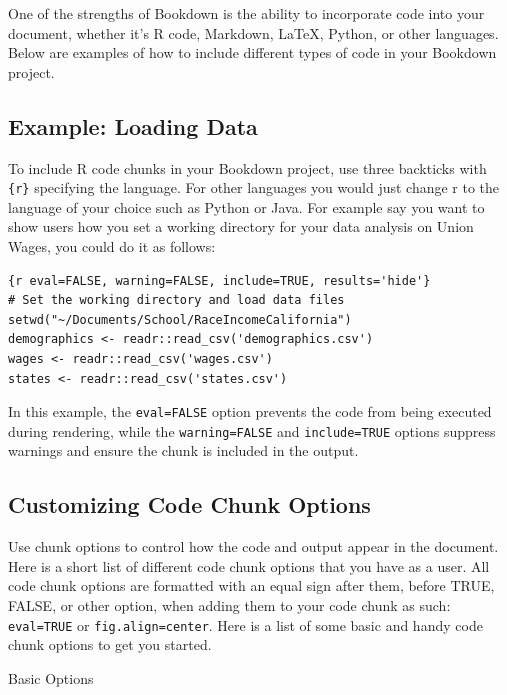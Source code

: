 \documentclass[
]{book}
\theoremstyle{definition}
\theoremstyle{definition}
\theoremstyle{definition}
\theoremstyle{definition}
\theoremstyle{remark}
\begin{document}
One of the strengths of Bookdown is the ability to incorporate code into your document, whether it's R code, Markdown, LaTeX, Python, or other languages. Below are examples of how to include different types of code in your Bookdown project.

\subsection{Example: Loading Data}\label{example-loading-data}

To include R code chunks in your Bookdown project, use three backticks \texttt{\textasciigrave{}\textasciigrave{}\textasciigrave{}} with \texttt{\{r\}} specifying the language. For other languages you would just change r to the language of your choice such as Python or Java. For example say you want to show users how you set a working directory for your data analysis on Union Wages, you could do it as follows:

\begin{verbatim}
{r eval=FALSE, warning=FALSE, include=TRUE, results='hide'}
# Set the working directory and load data files
setwd("~/Documents/School/RaceIncomeCalifornia")
demographics <- readr::read_csv('demographics.csv')
wages <- readr::read_csv('wages.csv')
states <- readr::read_csv('states.csv')
\end{verbatim}

In this example, the \texttt{eval=FALSE} option prevents the code from being executed during rendering, while the \texttt{warning=FALSE} and \texttt{include=TRUE} options suppress warnings and ensure the chunk is included in the output.

\subsection{Customizing Code Chunk Options}\label{customizing-code-chunk-options}

Use chunk options to control how the code and output appear in the document. Here is a short list of different code chunk options that you have as a user. All code chunk options are formatted with an equal sign after them, before TRUE, FALSE, or other option, when adding them to your code chunk as such: \texttt{eval=TRUE} or \texttt{fig.align=\textquotesingle{}center\textquotesingle{}}. Here is a list of some basic and handy code chunk options to get you started.

Basic Options
\end{document}
